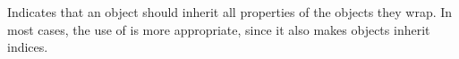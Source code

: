 
Indicates that an object should inherit all properties of the objects
they wrap. In most cases, the use of  is more
appropriate, since it also makes objects inherit indices.

